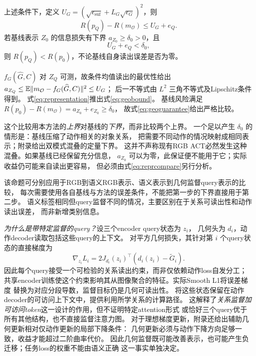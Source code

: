 \begin{proposition}[几何监督表示的比较保证]
\label{prop:geometry}
上述条件下，定义
$U_G=(\sqrt{\epsilon_{\mathrm{suf}}}+L_G\sqrt{\epsilon_G})^2$，则
\begin{equation}
 R(p_Q)-R(m_{\mathcal O})\leq U_G+e_Q.
 \label{eq:geobound}
\end{equation}
若基线表示 $Z_0$ 的信息损失有下界 $a_{Z_0}\geq\delta_0>0$，且
\begin{equation}
 U_G+e_Q<\delta_0,
 \label{eq:geoguarantee}
\end{equation}
则 $R(p_Q)<R(p_0)$，不论基线自身读出误差是否为零。
\end{proposition}
\begin{IEEEproof}
$f_G(\widehat G,C)$ 对 $Z_Q$ 可测，故条件均值读出的最优性给出
$a_{Z_Q}\leq\mathbb E\lVert m_{\mathcal O}-f_G(\widehat G,C)\rVert^2\leq U_G$；
后一不等式由 $L^2$ 三角不等式及Lipschitz条件得到。
式\eqref{eq:representation}推出式\eqref{eq:geobound}。
基线风险满足 $R(p_0)-R(m_{\mathcal O})=a_{Z_0}+e_{Z_0}\geq\delta_0$，
故式\eqref{eq:geoguarantee}给出严格比较。
\end{IEEEproof}

这个比较用本方法的\emph{上界}对基线的\emph{下界}，而非比较两个上界。
一个足以产生 $\delta_0$ 的情形是：基线压缩了动作相关的对象关系，
把需要不同动作的情况映射成相同表示；附录给出双模式混叠的定量下界。
这并不声称现有RGB ACT必然发生这种混叠。如果基线已经保留充分信息，
$a_{Z_0}$ 可以为零，此保证便不能用于它；实际收益仍可能来自读出更容易，
但必须由式\eqref{eq:reprcompare}另行分析。

该命题可分别应用于RGB到语义RGB表示、语义表示到几何监督query表示的比较，
每次需要使用各自基线与方法的误差条件，不能把第一步的下界直接用于第二步。
语义标签相同但query监督不同的情况，主要区别在于关系可读出性和动作读出误差，
而非新增类别信息。

\emph{为什么是带特定监督的query？}设三个encoder query状态为 $z_i$，
几何头为 $d_i$，动作decoder读取包括这些query的上下文。
对平方几何损失，其针对第 $i$ 个query状态的直接梯度为
\begin{equation}
 \nabla_{z_i}L_i
 =2J_{d_i}(z_i)^\top(d_i(z_i)-\widetilde G_i).
 \label{eq:querygradient}
\end{equation}
因此每个query接受一个可检验的关系读出约束，而非仅依赖动作loss自发分工；
共享encoder训练使这个约束影响其从图像聚合的特征。实际Smooth L1将误差梯度
替换为对应分段导数，监督目标仍是几何可读出性。
将这些状态保留在动作decoder的可访问上下文中，提供利用所学关系的计算路径。
这解释了\emph{关系监督加可访问token}这一设计的作用，但不证明特定attention形式
或恰好三个query优于所有其他结构，也不直接监督注意力图。
对于理想梯度更新，附录还给出辅助几何更新相对仅动作更新的局部下降条件：
几何更新必须与动作下降方向足够一致，收益才能超过二阶曲率代价。
因此几何监督既可能改善表示，也可能产生负迁移；任务loss的权重不能由语义正确
这一事实单独决定。

